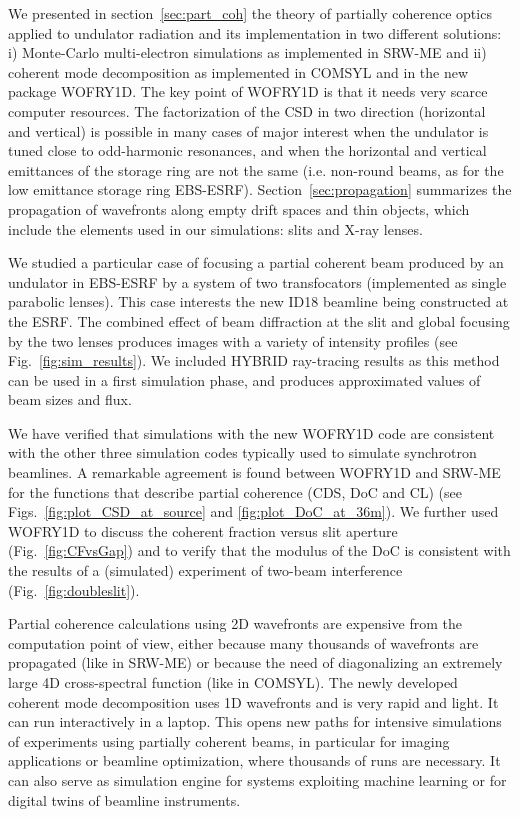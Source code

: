 \documentclass{iucr}              %
\begin{document}
We presented in section~\ref{sec:part_coh} the theory of partially coherence optics applied to undulator radiation and its implementation in two different solutions: i) Monte-Carlo multi-electron simulations as implemented in SRW-ME and ii) coherent mode decomposition as implemented in COMSYL and in the new package WOFRY1D.
The key point of WOFRY1D is that it needs very scarce computer resources.
The factorization of the CSD in two direction (horizontal and vertical) is possible in many cases of major interest when the undulator is tuned close to odd-harmonic resonances, and when the horizontal and vertical emittances of the storage ring are not the same (i.e. non-round beams, as for the low emittance storage ring  EBS-ESRF). 
Section~\ref{sec:propagation} summarizes the propagation of wavefronts along empty drift spaces and thin objects, which include the elements used in our simulations: slits and X-ray lenses. 

We studied a particular case of focusing a partial coherent beam produced by an undulator in EBS-ESRF by a system of two transfocators (implemented as single parabolic lenses). This case interests the new ID18 beamline being constructed at the ESRF. The combined effect of beam diffraction at the slit and global focusing by the two lenses produces images with a variety of intensity profiles (see Fig.~\ref{fig:sim_results}). 
We included HYBRID ray-tracing results as this method can be used in a first simulation phase, and produces approximated values of beam sizes and flux.

We have verified that simulations with the new WOFRY1D code are consistent with the other three simulation codes typically used to simulate synchrotron beamlines.
A remarkable agreement is found between WOFRY1D and SRW-ME for the functions that describe partial coherence (CDS, DoC and CL) (see Figs.~\ref{fig:plot_CSD_at_source} and \ref{fig:plot_DoC_at_36m}).
We further used WOFRY1D to discuss the coherent fraction versus slit aperture (Fig.~\ref{fig:CFvsGap}) and to verify that the modulus of the DoC is consistent with the results of a (simulated) experiment of two-beam interference (Fig.~\ref{fig:doubleslit}). 
 
Partial coherence calculations using 2D wavefronts are expensive from the computation point of view, either because many thousands of wavefronts are propagated (like in SRW-ME) or because the need of diagonalizing an extremely large 4D cross-spectral function (like in COMSYL). The newly developed coherent mode decomposition uses 1D wavefronts and is very rapid and light. It can run interactively in a laptop. This opens new paths for intensive simulations of experiments using partially coherent beams, in particular for imaging applications or beamline optimization, where thousands of runs are necessary. It can also serve as simulation engine for systems exploiting machine learning or for digital twins of beamline instruments. 
 
\end{document}
